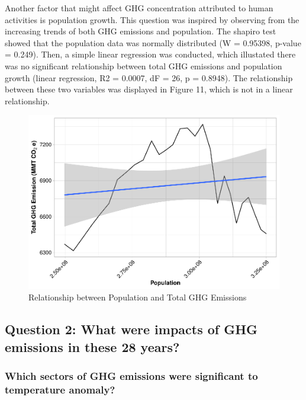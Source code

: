 \documentclass[12pt,]{article}
\begin{document}
Another factor that might affect GHG concentration attributed to human
activities is population growth. This question was inspired by observing
from the increasing trends of both GHG emissions and population. The
shapiro test showed that the population data was normally distributed (W
= 0.95398, p-value = 0.249). Then, a simple linear regression was
conducted, which illustated there was no significant relationship
between total GHG emissions and population growth (linear regression, R2
= 0.0007, dF = 26, p = 0.8948). The relationship between these two
variables was displayed in Figure 11, which is not in a linear
relationship.

\begin{figure}
\centering
\includegraphics{Project_Code_files/figure-latex/unnamed-chunk-29-1.pdf}
\caption{Relationship between Population and Total GHG Emissions}
\end{figure}

\newpage

\subsection{Question 2: What were impacts of GHG emissions in these 28
years?}\label{question-2-what-were-impacts-of-ghg-emissions-in-these-28-years}

\subsubsection{Which sectors of GHG emissions were significant to
temperature
anomaly?}\label{which-sectors-of-ghg-emissions-were-significant-to-temperature-anomaly}
\end{document}
